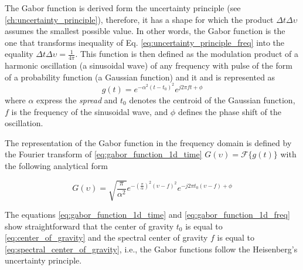 The Gabor function is derived form the uncertainty principle (see \ref{ch:uncertainty_principle}), therefore, it has a shape for which the product $\Delta t \Delta \upsilon$ assumes the smallest possible value. In other words, the Gabor function is the one that transforms inequality of Eq. \eqref{eq:uncertainty_principle_freq} into the equality $\Delta t \Delta \upsilon = \frac{1}{4 \pi}$. This function is then defined as the modulation product of a harmonic oscillation (a sinusoidal wave) of any frequency with pulse of the form of a probability function (a Gaussian function) \citep{Gabor:JIEE:1946} and it and is represented as
\begin{equation}\label{eq:gabor_function_1d_time}
    g(t) =  e ^{-\alpha^2(t-t_0)^2} e ^{j 2 \pi f t + \phi}
\end{equation}
where $\alpha$ express the \textit{spread} and $t_0$ denotes the centroid of the Gaussian function, $f$ is the frequency of the sinusoidal wave, and $\phi$ defines the phase shift of the oscillation.

The representation of the Gabor function in the frequency domain is defined by the Fourier transform of \eqref{eq:gabor_function_1d_time} $G(\upsilon) = \mathcal{F}\{g(t)\}$ with the following analytical form

\begin{equation}\label{eq:gabor_function_1d_freq}
    G(\upsilon) =  \sqrt{\frac{\pi}{\alpha^2}} e ^{-\left(\frac{\pi}{\alpha}\right) ^{2} (\upsilon-f)^2} e ^{-j 2 \pi t_0 (\upsilon-f) + \phi}
\end{equation}

The equations \eqref{eq:gabor_function_1d_time} and \eqref{eq:gabor_function_1d_freq} show straightforward that the center of gravity $t_0$ is equal to \eqref{eq:center_of_gravity} and the spectral center of gravity $f$ is equal to \eqref{eq:spectral_center_of_gravity}, i.e., the Gabor functions follow the Heisenberg's uncertainty principle.   

